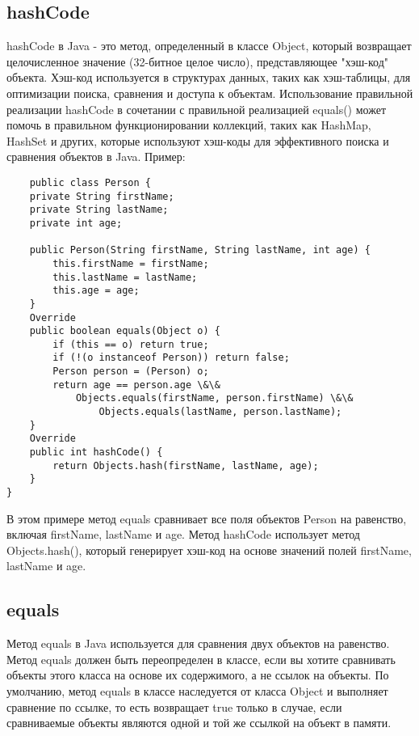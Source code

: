 \subsection{hashCode}
hashCode в Java - это метод, определенный в классе Object, который возвращает целочисленное значение (32-битное целое число), представляющее "хэш-код" объекта. Хэш-код используется в структурах данных, таких как хэш-таблицы, для оптимизации поиска, сравнения и доступа к объектам.
Использование правильной реализации hashCode в сочетании с правильной реализацией equals() может помочь в правильном функционировании коллекций, таких как HashMap, HashSet и других, которые используют хэш-коды для эффективного поиска и сравнения объектов в Java.
Пример:
\begin{lstlisting}
    public class Person {
    private String firstName;
    private String lastName;
    private int age;

    public Person(String firstName, String lastName, int age) {
        this.firstName = firstName;
        this.lastName = lastName;
        this.age = age;
    }
    Override
    public boolean equals(Object o) {
        if (this == o) return true;
        if (!(o instanceof Person)) return false;
        Person person = (Person) o;
        return age == person.age \&\&
            Objects.equals(firstName, person.firstName) \&\&
                Objects.equals(lastName, person.lastName);
    }
    Override
    public int hashCode() {
        return Objects.hash(firstName, lastName, age);
    }
}
\end{lstlisting}
В этом примере метод equals сравнивает все поля объектов Person на равенство, включая firstName, lastName и age. Метод hashCode использует метод Objects.hash(), который генерирует хэш-код на основе значений полей firstName, lastName и age.
\subsection{equals} 
Метод equals в Java используется для сравнения двух объектов на равенство.
Метод equals должен быть переопределен в классе, если вы хотите сравнивать объекты этого класса на основе их содержимого, а не ссылок на объекты. По умолчанию, метод equals в классе наследуется от класса Object и выполняет сравнение по ссылке, то есть возвращает true только в случае, если сравниваемые объекты являются одной и той же ссылкой на объект в памяти.

